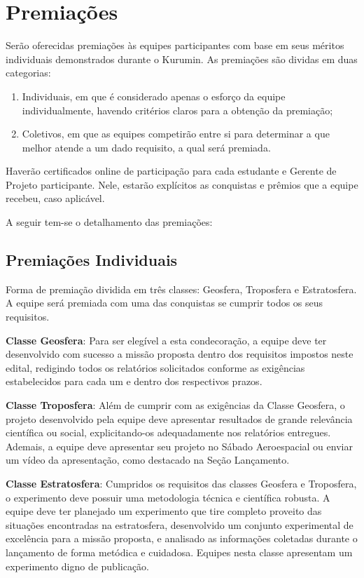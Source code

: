\section{Premiações}
    Serão oferecidas premiações às equipes participantes com base em seus méritos individuais demonstrados durante o Kurumin. As premiações são dividas em duas categorias: 
    \begin{enumerate}
        \item Individuais, em que é considerado apenas o esforço da equipe individualmente, havendo critérios claros para a obtenção da premiação;
        \item Coletivos, em que as equipes competirão entre si para determinar a que melhor atende a um dado requisito, a qual será premiada.
    \end{enumerate}   

    Haverão certificados online de participação para cada estudante e Gerente de Projeto participante. Nele, estarão explícitos as conquistas e prêmios que a equipe recebeu, caso aplicável.

    A seguir tem-se o detalhamento das premiações:

    \subsection{Premiações Individuais}
        Forma de premiação dividida em três classes: Geosfera, Troposfera e Estratosfera. A equipe será premiada com uma das conquistas se cumprir todos os seus requisitos.
        
        \textbf{Classe Geosfera}: Para ser elegível a esta condecoração, a equipe deve ter desenvolvido com sucesso a missão proposta dentro dos requisitos impostos neste edital, redigindo todos os relatórios solicitados conforme as exigências estabelecidos para cada um e dentro dos respectivos prazos.
        
        \textbf{Classe Troposfera}: Além de cumprir com as exigências da Classe Geosfera, o projeto desenvolvido pela equipe deve apresentar resultados de grande relevância científica ou social, explicitando-os adequadamente nos relatórios entregues. Ademais, a equipe deve apresentar seu projeto no Sábado Aeroespacial ou enviar um vídeo da apresentação, como destacado na Seção Lançamento.
        
        \textbf{Classe Estratosfera}: Cumpridos os requisitos das classes Geosfera e Troposfera, o experimento deve possuir uma metodologia técnica e científica robusta. A equipe deve ter planejado um experimento que tire completo proveito das situações encontradas na estratosfera, desenvolvido um conjunto experimental de excelência para a missão proposta, e analisado as informações coletadas durante o lançamento de forma metódica e cuidadosa. Equipes nesta classe apresentam um experimento digno de publicação.
        
